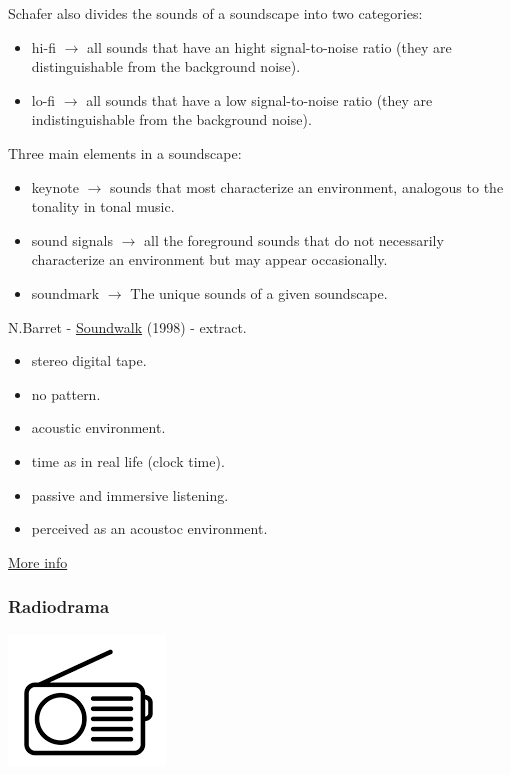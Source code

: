 Schafer also divides the sounds of a soundscape into two categories:

\begin{itemize}
\tightlist
\item hi-fi \(\rightarrow\) all sounds that have an hight signal-to-noise ratio (they are distinguishable from the background noise).
\item lo-fi \(\rightarrow\) all sounds that have a low signal-to-noise ratio (they are indistinguishable from the background noise).
\end{itemize}

Three main elements in a soundscape:

\begin{itemize}
\tightlist
\item keynote \(\rightarrow\) sounds that most characterize an environment, analogous to the tonality in tonal music.
\item sound signals \(\rightarrow\) all the foreground sounds that do not necessarily characterize an environment but may appear occasionally.
\item soundmark \(\rightarrow\) The unique sounds of a given soundscape.
\end{itemize}

N.Barret - \href{http://www.musicaecodice.it/gitmedia/emc/2_media/soundwalk.mp3}{Soundwalk} (1998) - extract.

\begin{itemize}
\tightlist
\item stereo digital tape. 
\item no pattern. 
\item acoustic environment. 
\item time as in real life (clock time). 
\item passive and immersive listening. 
\item perceived as an acoustoc environment.
\end{itemize}

\href{http://www.musicaecodice.it/gitmedia/emc/2_media//schafer.pdf}{More info}

\subsubsection{Radiodrama }\label{radiodrama}

\begin{center}
\includegraphics[scale=0.5]{../img/radio.png}
\end{center}

